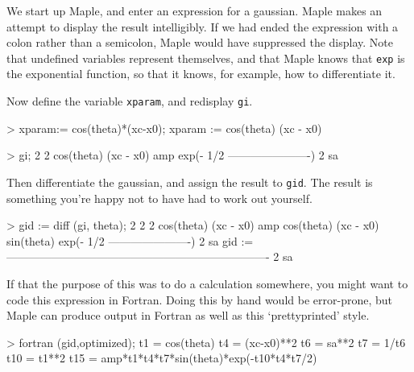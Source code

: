 \documentclass[11pt,oneside,chapters]{starlink}
\begin{document}
We start up Maple, and enter an expression for a gaussian.
Maple makes an attempt to display the result intelligibly.
If we had ended the expression with a colon rather than a
semicolon, Maple would have suppressed the display.  Note
that undefined variables represent themselves, and that
Maple knows that \texttt{exp} is the exponential
function, so that it knows, for example, how to
differentiate it.

Now define the variable \texttt{xparam}, and redisplay
\texttt{gi}.

\begin{terminalv}
> xparam:= cos(theta)*(xc-x0);
      xparam := cos(theta) (xc - x0)

> gi;
                                             2          2
                                   cos(theta)  (xc - x0)
                     amp exp(- 1/2 ----------------------)
                                              2
                                            sa
\end{terminalv}

Then differentiate the gaussian, and assign the result to
\texttt{gid}.  The result is something you're happy not
to have had to work out yourself.

\begin{terminalv}
> gid := diff (gi, theta);
                                                                 2          2
                                2                      cos(theta)  (xc - x0)
        amp cos(theta) (xc - x0)  sin(theta) exp(- 1/2 ----------------------)
                                                                  2
                                                                sa
 gid := ----------------------------------------------------------------------
                                           2
                                         sa
\end{terminalv}

If that the purpose of this was to do a calculation
somewhere, you might want to code this expression in
Fortran.  Doing this by hand would be error-prone, but Maple
can produce output in Fortran as well as this
`prettyprinted' style.

\begin{terminalv}
> fortran (gid,optimized);
      t1 = cos(theta)
      t4 = (xc-x0)**2
      t6 = sa**2
      t7 = 1/t6
      t10 = t1**2
      t15 = amp*t1*t4*t7*sin(theta)*exp(-t10*t4*t7/2)
\end{terminalv}
\end{document}
